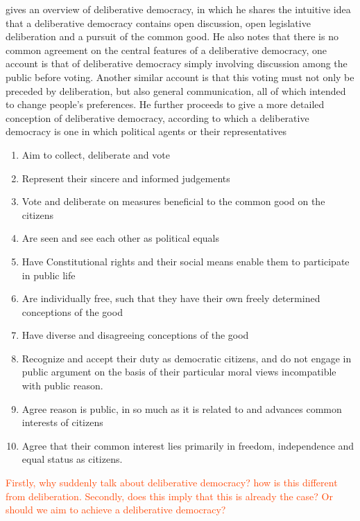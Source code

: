 
\citet{freemanDeliberativeDemocracySympathetic2000} gives an overview of deliberative democracy, in which he shares the intuitive idea that a deliberative democracy contains open discussion, open legislative deliberation and a pursuit of the common good. He also notes that there is no common agreement on the central features of a deliberative democracy, one account is that of deliberative democracy simply involving discussion among the public before voting. Another similar account is that this voting must not only be preceded by deliberation, but also general communication, all of which intended to change people's preferences. He further proceeds to give a more detailed conception of deliberative democracy, according to which a deliberative democracy is one in which political agents or their representatives

\begin{enumerate}
	\label{list:deliberative-democracy}
	\setlength\itemsep{1px}
	\item  Aim to collect, deliberate and vote
	\item  Represent their sincere and informed judgements
	\item  Vote and deliberate on measures beneficial to the common good on the citizens
	\item  Are seen and see each other as political equals
	\item  Have Constitutional rights and their social means enable them to participate in public life
	\item  Are individually free, such that they have their own freely determined conceptions of the good
	\item  Have diverse and disagreeing conceptions of the good
	\item  Recognize and accept their duty as democratic citizens, and do not engage in public argument on the basis of their particular moral views incompatible with public reason.
	\item  Agree reason is public, in so much as it is related to and advances common interests of citizens
	\item  Agree that their common interest lies primarily in freedom, independence and equal status as citizens.
\end{enumerate}

\textcolor{OrangeRed}{Firstly, why suddenly talk about deliberative democracy? how is this different from deliberation. Secondly, does this imply that this is already the case? Or should we aim to achieve a deliberative democracy?}

